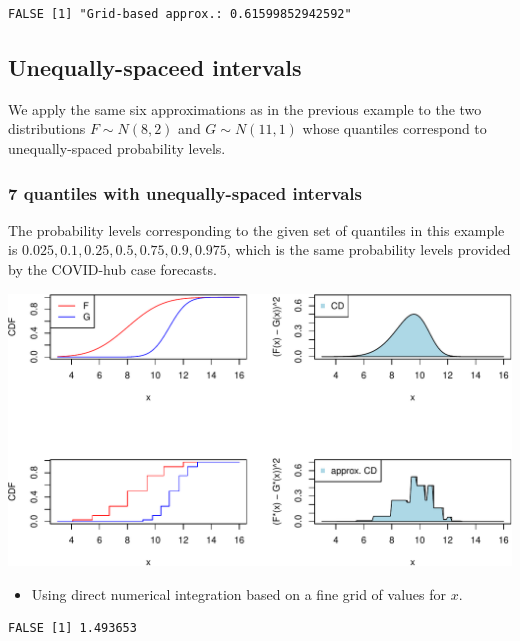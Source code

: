 \documentclass[
]{article}
\providecommand{\tightlist}{%
  \setlength{\itemsep}{0pt}\setlength{\parskip}{0pt}}
\begin{document}
\begin{verbatim}
FALSE [1] "Grid-based approx.: 0.61599852942592"
\end{verbatim}

\hypertarget{unequally-spaceed-intervals}{%
\subsection{Unequally-spaceed
intervals}\label{unequally-spaceed-intervals}}

We apply the same six approximations as in the previous example to the
two distributions \(F\sim N(8,2)\) and \(G \sim N(11,1)\) whose
quantiles correspond to unequally-spaced probability levels.

\hypertarget{quantiles-with-unequally-spaced-intervals}{%
\subsubsection{7 quantiles with unequally-spaced
intervals}\label{quantiles-with-unequally-spaced-intervals}}

The probability levels corresponding to the given set of quantiles in
this example is \(0.025,0.1,0.25,0.5,0.75,0.9,0.975\), which is the same
probability levels provided by the COVID-hub case forecasts.

\begin{center}\includegraphics{cd_approx_2_files/figure-latex/unnamed-chunk-22-1} \end{center}

\begin{itemize}
\tightlist
\item
  Using direct numerical integration based on a fine grid of values for
  \(x\).
\end{itemize}

\begin{verbatim}
FALSE [1] 1.493653
\end{verbatim}
\end{document}
